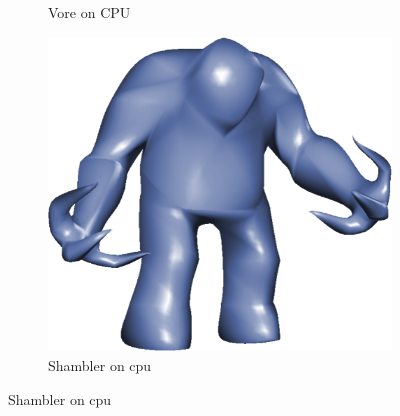 \begin{figure}
\begin{subfigure}[b]{0.2\textwidth}
		\caption{Vore on CPU}
		\label{fig:results:cpugpu:cpuVore}
	\end{subfigure}	
	\hspace{0.1\textwidth}
	\begin{subfigure}[b]{0.2\textwidth}
		\centering
		\includegraphics[width=\textwidth]{content/img/results/shamblercpu.png}
		\caption{Shambler on cpu}
		\label{fig:results:cpugpu:cpuShambler}
	\end{subfigure}		


\end{figure}

